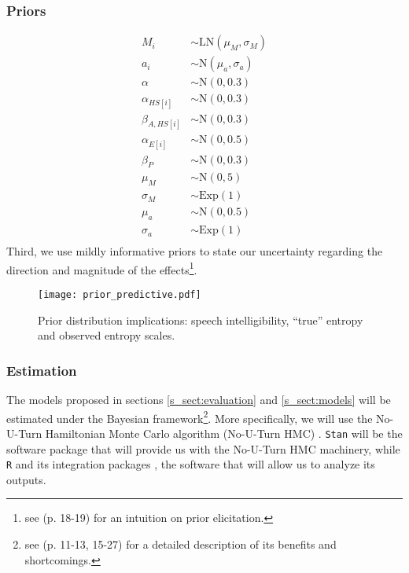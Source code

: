 \subsubsection{Priors}
%
\begin{align}
	M_{i} & \sim \text{LN}( \mu_{M}, \sigma_{M}) \\
	a_{i} & \sim \text{N}(\mu_{a}, \sigma_{a}) \\
	\alpha & \sim \text{N}(0, 0.3) \\
	\alpha_{HS[i]} & \sim \text{N}(0, 0.3) \\
	\beta_{A, HS[i]} & \sim \text{N}(0 , 0.3) \\
	\alpha_{E[i]} & \sim \text{N}(0, 0.5) \\
	\beta_{P} & \sim \text{N}(0, 0.3) \\
	\mu_{M} & \sim \text{N}(0, 5) \\
	\sigma_{M} & \sim \text{Exp}(1) \\
	\mu_{a} & \sim \text{N}(0, 0.5) \\
	\sigma_{a} & \sim \text{Exp}(1)\\
\end{align}
Third, we use mildly informative priors to state our uncertainty regarding the direction and magnitude of the effects\footnote{see \citet{Rivera_2021} (p. 18-19) for an intuition on prior elicitation.}. 
\begin{figure}
	\centering
	\texttt{[image: prior\_predictive.pdf]}
	\caption[Prior distribution implications]{Prior distribution implications: speech intelligibility, ``true'' entropy and observed entropy scales.}
	\label{fig:priors}
\end{figure}
%
%
\subsubsection{Estimation} \label{ssSA:model_estimation}
The models proposed in sections \ref{s_sect:evaluation} and \ref{s_sect:models} will be estimated under the Bayesian framework\footnote{see \citet{Rivera_2021} (p. 11-13, 15-27) for a detailed description of its benefits and shortcomings.}. More specifically, we will use the No-U-Turn Hamiltonian Monte Carlo algorithm (No-U-Turn HMC) \citep{Betancourt_et_al_2013, Duane_et_al_1987, Hoffman_et_al_2014, Neal_2012}. \texttt{Stan} \citep{Stan_2020} will be the software package that will provide us with the No-U-Turn HMC machinery, while \texttt{R} \citep{R_2015} and its integration packages \citep{RStan_2020}, the software that will allow us to analyze its outputs.
%
%
